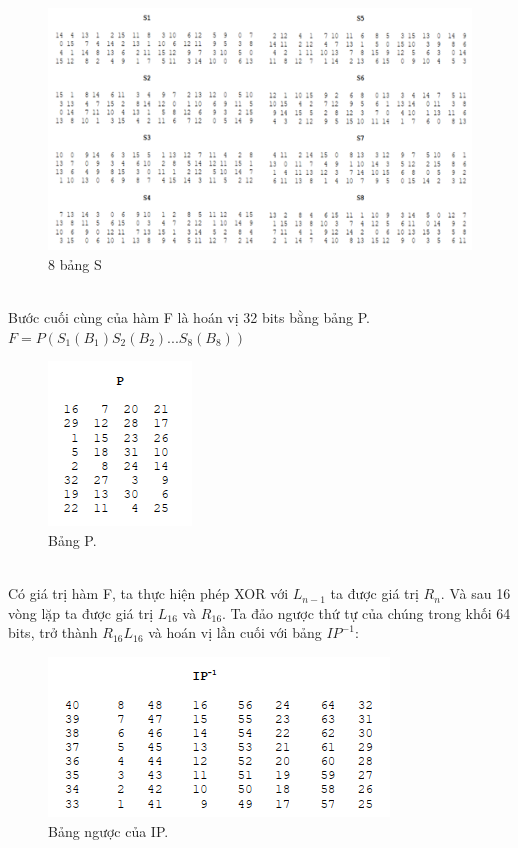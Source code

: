 \documentclass[a4paper]{article}
\begin{document}
\begin{figure}[htp]
    \centering
    \includegraphics[scale=1.1]{S.png}
    \caption{8 bảng S}
    \label{fig:S}
\end{figure}
\\Bước cuối cùng của hàm  F là hoán vị 32 bits bằng bảng P. $F=P(S_1(B_1)S_2(B_2)...S_8(B_8))$
\begin{figure}[htp]
    \centering
    \includegraphics{P.png}
    \caption{Bảng P.}
    \label{fig:P}
\end{figure}
\\Có giá trị hàm F, ta thực hiện phép XOR với $L_{n-1}$ ta được giá trị $R_n$. Và sau 16 vòng lặp ta được giá trị $L_{16}$ và $R_{16}$. Ta đảo ngược thứ tự của chúng trong khối 64 bits, trở thành $R_{16}L_{16}$ và hoán vị lần cuối với bảng $IP^{-1}$:
\\
\begin{figure}[htp]
    \centering
    \includegraphics{IPreverse.png}
    \caption{Bảng ngược của IP.}
    \label{fig:IPreverse}
\end{figure}
\end{document}
